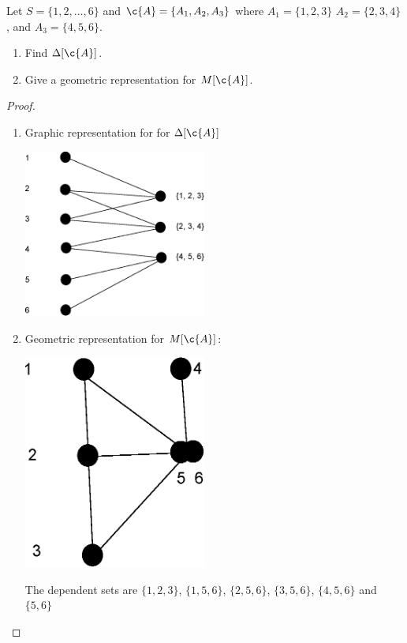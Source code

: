 \prob
{
    Let $S = \{1, 2, \dots, 6\}$ and $\c{A} = \{A_1, A_2, A_3\}$ where $A_1 = \{1, 2, 3\}$
    $A_2 = \{2, 3, 4\}$, and $A_3 = \{4, 5, 6\}$.
    \begin{enumerate}[label=(\roman*)]
        \item   Find $\Delta[\c{A}]$.
        \item   Give a geometric representation for $M[\c{A}]$.
    \end{enumerate}
}
\begin{proof}$\,$\pn
    \begin{enumerate}
        \item   Graphic representation for for $\Delta[\c{A}]$

                \begin{center}
                    \includegraphics[width=6cm]{Test1/Problem11/deltaA.eps}
                \end{center}
        
        \item   Geometric representation for $M[\c{A}]$:
                \begin{center}
                    \includegraphics[width=6cm]{Test1/Problem11/graphicrepresentationDeltaA.eps}
                \end{center}
                The dependent sets are $\{1, 2, 3\}$, $\{1, 5, 6\}$, $\{2, 5, 6\}$, $\{3, 5, 6\}$, $\{4, 5, 6\}$ and $\{5, 6\}$
    \end{enumerate}

\end{proof}